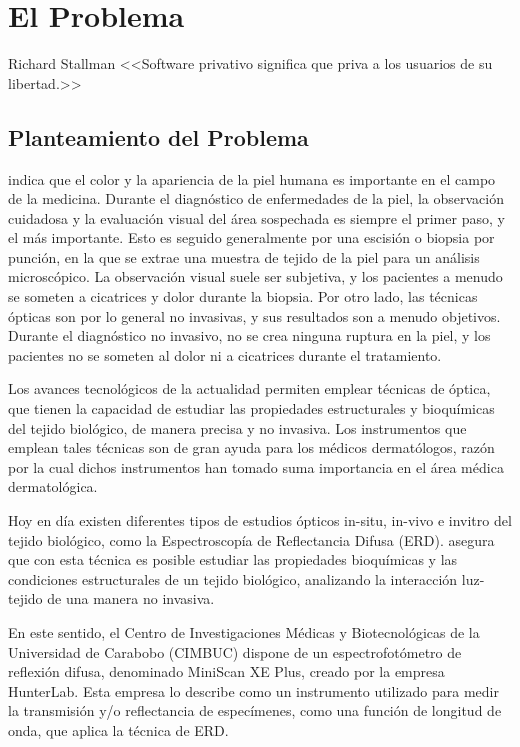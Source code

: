 \chapter{\label{cap:1}El Problema}

\begin{chapquote}{Richard Stallman}
<<Software privativo significa que priva a los usuarios de su libertad.>>
\end{chapquote}

	\section{Planteamiento del Problema}	
\cite{Bersha} indica que el color y la apariencia de la piel humana es importante en el campo de la medicina. Durante el diagn\'{o}stico de enfermedades de la piel, la observaci\'{o}n cuidadosa y la evaluaci\'{o}n visual del \'{a}rea sospechada es siempre el primer paso, y el m\'{a}s importante. Esto es seguido generalmente por una escisi\'{o}n o biopsia por punci\'{o}n, en la que se extrae una muestra de tejido de la piel para un an\'{a}lisis microsc\'{o}pico. La observaci\'{o}n visual suele ser subjetiva, y los pacientes a menudo se someten a cicatrices y dolor durante la biopsia. Por otro lado, las t\'{e}cnicas \'{o}pticas son por lo general no invasivas, y sus resultados son a menudo objetivos. Durante el diagn\'{o}stico no invasivo, no se crea ninguna ruptura en la piel, y los pacientes no se someten al dolor ni a cicatrices durante el tratamiento.

Los avances tecnol\'{o}gicos de la actualidad permiten emplear t\'{e}cnicas de \'{o}ptica, que tienen la capacidad de estudiar  las propiedades estructurales y bioqu\'{i}micas del tejido biol\'{o}gico, de manera precisa y no invasiva. Los instrumentos que emplean tales t\'{e}cnicas son de gran ayuda para los m\'{e}dicos dermat\'{o}logos, raz\'{o}n por la cual dichos instrumentos han tomado suma importancia en el \'{a}rea m\'{e}dica dermatol\'{o}gica.

Hoy en d\'{i}a existen diferentes tipos de estudios \'{o}pticos in-situ, in-vivo e invitro del tejido biol\'{o}gico, como la Espectroscop\'{i}a de Reflectancia Difusa (ERD). \cite{Perez} asegura que con esta t\'{e}cnica es  posible estudiar las propiedades bioqu\'{i}micas y las condiciones estructurales de un tejido biol\'{o}gico, analizando la interacci\'{o}n luz-tejido de una manera no invasiva.

En este sentido, el Centro de Investigaciones M\'{e}dicas y Biotecnol\'{o}gicas de la Universidad de Carabobo (CIMBUC) dispone de un espectrofot\'{o}metro de reflexi\'{o}n difusa, denominado MiniScan XE Plus, creado por la empresa HunterLab. Esta empresa lo describe como un instrumento utilizado para medir la transmisi\'{o}n y/o reflectancia de espec\'{i}menes, como una funci\'{o}n de longitud de onda, que aplica la t\'{e}cnica de ERD. 

